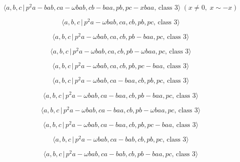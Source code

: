 \documentclass[10pt]{article}
\begin{document}
\begin{equation}
\langle a,b,c\,|\,p^{2}a-bab,ca-\omega bab,cb-baa,pb,pc-xbaa,\,\text{class }%
3\rangle \;(x\neq 0,\;x\sim -x)  \tag{7.1152}
\end{equation}

\begin{equation}
\langle a,b,c\,|\,p^{2}a-\omega bab,ca,cb,pb,pc,\,\text{class }3\rangle 
\tag{7.1153}
\end{equation}

\begin{equation}
\langle a,b,c\,|\,p^{2}a-\omega bab,ca,cb,pb-baa,pc,\,\text{class }3\rangle 
\tag{7.1154}
\end{equation}

\begin{equation}
\langle a,b,c\,|\,p^{2}a-\omega bab,ca,cb,pb-\omega baa,pc,\,\text{class }%
3\rangle  \tag{7.1155}
\end{equation}

\begin{equation}
\langle a,b,c\,|\,p^{2}a-\omega bab,ca,cb,pb,pc-baa,\,\text{class }3\rangle 
\tag{7.1156}
\end{equation}

\begin{equation}
\langle a,b,c\,|\,p^{2}a-\omega bab,ca-baa,cb,pb,pc,\,\text{class }3\rangle 
\tag{7.1157}
\end{equation}

\begin{equation}
\langle a,b,c\,|\,p^{2}a-\omega bab,ca-baa,cb,pb-baa,pc,\,\text{class }%
3\rangle  \tag{7.1158}
\end{equation}

\begin{equation}
\langle a,b,c\,|\,p^{2}a-\omega bab,ca-baa,cb,pb-\omega baa,pc,\,\text{class 
}3\rangle  \tag{7.1159}
\end{equation}

\begin{equation}
\langle a,b,c\,|\,p^{2}a-\omega bab,ca-baa,cb,pb,pc-baa,\,\text{class }%
3\rangle  \tag{7.1160}
\end{equation}

\begin{equation}
\langle a,b,c\,|\,p^{2}a-\omega bab,ca-bab,cb,pb,pc,\,\text{class }3\rangle 
\tag{7.1161}
\end{equation}

\begin{equation}
\langle a,b,c\,|\,p^{2}a-\omega bab,ca-bab,cb,pb-baa,pc,\,\text{class }%
3\rangle  \tag{7.1162}
\end{equation}
\end{document}
